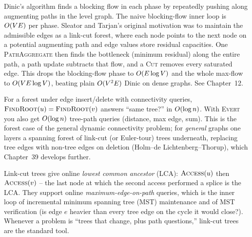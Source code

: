 \begin{applicationbox}
Dinic's algorithm finds a blocking flow in each phase by repeatedly pushing along
augmenting paths in the level graph. The naive blocking-flow inner loop is
$O(VE)$ per phase. Sleator and Tarjan's original motivation was to maintain the admissible edges as
a link-cut forest, where each node points to the next node on a potential
augmenting path and edge values store residual capacities. One
\textsc{PathAggregate} then finds the bottleneck (minimum residual) along the
entire path, a path update subtracts that flow, and a \textsc{Cut} removes every
saturated edge. This drops the blocking-flow phase to
$O(E\log V)$ and the whole max-flow to $O(VE\log V)$, beating plain $O(V^2E)$
Dinic on dense graphs. See Chapter~12.
\end{applicationbox}

\begin{applicationbox}
For a forest under edge insert/delete with connectivity queries,
$\textsc{FindRoot}(u)=\textsc{FindRoot}(v)$ answers ``same tree?'' in
$O(\log n)$. With \textsc{Evert} you also get $O(\log n)$ tree-path queries
(distance, max edge, sum). This is the forest case of the general dynamic
connectivity problem; for \emph{general} graphs one layers a spanning forest of
link-cut (or Euler-tour) trees underneath, replacing tree edges with non-tree
edges on deletion (Holm--de Lichtenberg--Thorup), which Chapter~39
develops further.
\end{applicationbox}

\begin{applicationbox}
Link-cut trees give online \emph{lowest common ancestor} (LCA): $\textsc{Access}(u)$
then $\textsc{Access}(v)$ -- the last node at which the second access performed a
splice is the LCA. They support online \emph{maximum-edge-on-path} queries, which
is the inner loop of incremental minimum spanning tree (MST) maintenance and of MST
verification (is edge $e$ heavier than every tree edge on the cycle it would
close?). Whenever a problem is ``trees that change, plus path questions,''
link-cut trees are the standard tool.
\end{applicationbox}

